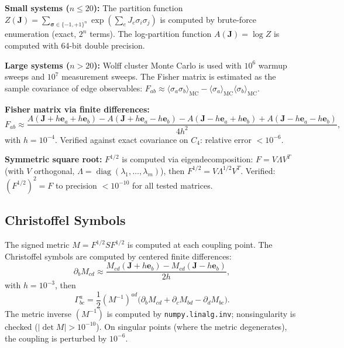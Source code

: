 \documentclass[11pt]{article}
\theoremstyle{definition}
\theoremstyle{remark}
\newcommand{\Fish}{F}
\newcommand{\sgn}{S}
\newcommand{\Met}{M}
\newcommand{\coupl}{\mathbf{J}}
\newcommand{\partf}{Z}
\newcommand{\Chr}[2]{\Gamma^{#1}_{#2}}
\newcommand{\diag}{\operatorname{diag}}
\newcommand{\edgeo}{\sigma}
\begin{document}
\textbf{Small systems ($n \leq 20$):} The partition function
$\partf(\coupl) = \sum_{\boldsymbol{\sigma} \in \{-1,+1\}^n}
\exp(\sum_{e} J_e \sigma_i \sigma_j)$ is computed by brute-force
enumeration (exact, $2^n$ terms). The log-partition function
$A(\coupl) = \log \partf$ is computed with 64-bit double precision.

\textbf{Large systems ($n > 20$):} Wolff cluster Monte Carlo is used
with $10^6$ warmup sweeps and $10^7$ measurement sweeps. The Fisher
matrix is estimated as the sample covariance of edge observables:
$\Fish_{ab} \approx \langle \edgeo_a \edgeo_b \rangle_{\mathrm{MC}}
- \langle \edgeo_a \rangle_{\mathrm{MC}} \langle \edgeo_b \rangle_{\mathrm{MC}}$.

\textbf{Fisher matrix via finite differences:}
\begin{equation}
  \Fish_{ab} \approx \frac{A(\coupl + h\mathbf{e}_a + h\mathbf{e}_b)
    - A(\coupl + h\mathbf{e}_a - h\mathbf{e}_b)
    - A(\coupl - h\mathbf{e}_a + h\mathbf{e}_b)
    + A(\coupl - h\mathbf{e}_a - h\mathbf{e}_b)}{4h^2},
  \label{eq:fisher-num}
\end{equation}
with $h = 10^{-4}$. Verified against exact covariance on $C_4$:
relative error $< 10^{-6}$.

\textbf{Symmetric square root:} $\Fish^{1/2}$ is computed via
eigendecomposition: $\Fish = V \Lambda V^T$ (with $V$ orthogonal,
$\Lambda = \diag(\lambda_1, \ldots, \lambda_m)$), then
$\Fish^{1/2} = V \Lambda^{1/2} V^T$. Verified: $(\Fish^{1/2})^2 = \Fish$
to precision $< 10^{-10}$ for all tested matrices.

\subsection{Christoffel Symbols}

The signed metric $\Met = \Fish^{1/2}\sgn\Fish^{1/2}$ is computed at
each coupling point. The Christoffel symbols are computed by centered
finite differences:
\begin{equation}
  \partial_b \Met_{cd} \approx \frac{\Met_{cd}(\coupl + h\mathbf{e}_b)
    - \Met_{cd}(\coupl - h\mathbf{e}_b)}{2h},
  \label{eq:metric-diff}
\end{equation}
with $h = 10^{-3}$, then
\begin{equation}
  \Chr{a}{bc} = \frac{1}{2}(\Met^{-1})^{ad}
    \bigl(\partial_b \Met_{cd} + \partial_c \Met_{bd}
      - \partial_d \Met_{bc}\bigr).
\end{equation}
The metric inverse $(\Met^{-1})$ is computed by \texttt{numpy.linalg.inv};
nonsingularity is checked ($|\det\Met| > 10^{-10}$). On singular points
(where the metric degenerates), the coupling is perturbed by $10^{-6}$.
\end{document}
